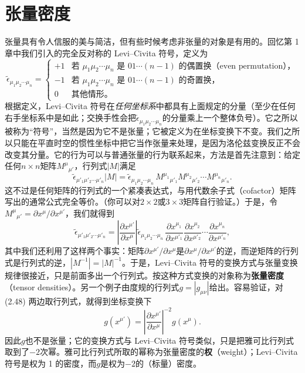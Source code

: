 \section{张量密度}

张量具有令人信服的美与简洁，但有些时候考虑非张量的对象是有用的。回忆第 1 章中我们引入的完全反对称的 Levi–Civita 符号，定义为
\begin{equation*}
\tilde\epsilon_{\mu_1\mu_2\cdots\mu_n}=
\begin{cases}
+1 & \text{若 $\mu_1\mu_2\cdots\mu_n$ 是 $01\cdots(n-1)$ 的偶置换（even permutation），}\\
-1 & \text{若 $\mu_1\mu_2\cdots\mu_n$ 是 $01\cdots(n-1)$ 的奇置换，}\\
0 & \text{其他情形。}
\end{cases}
\tag{2.65}
\end{equation*}
根据定义，Levi–Civita 符号在\emph{任何坐标系}中都具有上面规定的分量（至少在任何右手坐标系中是如此；交换手性会把$\tilde\epsilon_{\mu_1\mu_2\cdots\mu_n}$的分量乘上一个整体负号）。它之所以被称为“符号”，当然是因为它不是张量；它被定义为在坐标变换下不变。我们之所以只能在平直时空的惯性坐标中把它当作张量来处理，是因为洛伦兹变换反正不会改变其分量。它的行为可以与普通张量的行为联系起来，方法是首先注意到：给定任何$n\times n$矩阵$M^\mu{}_{\mu'}$，行列式$|M|$满足
\begin{equation*}
\tilde\epsilon_{\mu'_1\mu'_2\cdots\mu'_n}|M|=\tilde\epsilon_{\mu_1\mu_2\cdots\mu_n}\,M^{\mu_1}{}_{\mu'_1}M^{\mu_2}{}_{\mu'_2}\cdots M^{\mu_n}{}_{\mu'_n}.
\tag{2.66}
\end{equation*}
这不过是任何矩阵的行列式的一个紧凑表达式，与用代数余子式（cofactor）矩阵写出的通常公式完全等价。（你可以对$2\times2$或$3\times3$矩阵自行验证。）于是，令$M^\mu{}_{\mu'}=\partial x^\mu/\partial x^{\mu'}$，我们就得到
\begin{equation*}
\tilde\epsilon_{\mu'_1\mu'_2\cdots\mu'_n}=\left|\frac{\partial x^{\mu'}}{\partial x^\mu}\right|\tilde\epsilon_{\mu_1\mu_2\cdots\mu_n}\,\frac{\partial x^{\mu_1}}{\partial x^{\mu'_1}}\frac{\partial x^{\mu_2}}{\partial x^{\mu'_2}}\cdots\frac{\partial x^{\mu_n}}{\partial x^{\mu'_n}},
\tag{2.67}
\end{equation*}
其中我们还利用了这样两个事实：矩阵$\partial x^{\mu'}/\partial x^\mu$是$\partial x^\mu/\partial x^{\mu'}$的逆，而逆矩阵的行列式是行列式的逆，$|M^{-1}|=|M|^{-1}$。于是，Levi–Civita 符号的变换方式与张量变换规律很接近，只是前面多出一个行列式。按这种方式变换的对象称为\textbf{张量密度}（tensor densities）。另一个例子由度规的行列式$g=|g_{\mu\nu}|$给出。容易验证，对 (2.48) 两边取行列式，就得到坐标变换下
\begin{equation*}
g(x^{\mu'})=\left|\frac{\partial x^{\mu'}}{\partial x^\mu}\right|^{-2}g(x^\mu).
\tag{2.68}
\end{equation*}
因此$g$也不是张量；它的变换方式与 Levi–Civita 符号类似，只是把雅可比行列式取到了$-2$次幂。雅可比行列式所取的幂称为张量密度的\textbf{权}（weight）；Levi–Civita 符号是权为 1 的密度，而$g$是权为$-2$的（标量）密度。

